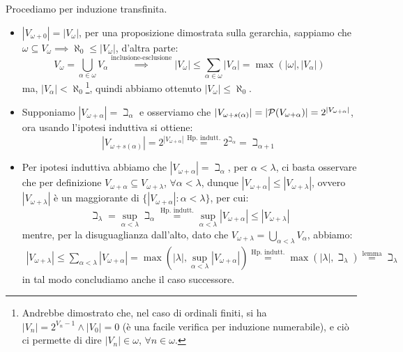 \begin{soln}
	Procediamo per induzione transfinita.
	\begin{itemize}
		\item[$\boxed{\text{caso 0}}$] $|V_{\omega + 0}| = |V_{\omega}|$, per una proposizione dimostrata sulla gerarchia, sappiamo che $\omega \subseteq V_{\omega} \implies \aleph_0 \leq |V_{\omega}|$, d'altra parte:
		\[ V_{\omega} = \bigcup_{\alpha \in \omega} V_{\alpha} \overset{\text{inclusione-esclusione}}{\implies} |V_\omega| \leq \sum_{\alpha \in \omega} |V_{\alpha}| = \max(|\omega|,|V_\alpha|)
			\]
		ma, $|V_\alpha| < \aleph_0$\footnote{Andrebbe dimostrato che, nel caso di ordinali finiti, si ha $|V_n| = 2^{V_n-1} \land |V_0| = 0$ (\`e una facile verifica per induzione numerabile), e ci\`o ci permette di dire $|V_n| \in \omega$, $\forall n \in \omega$.}, quindi abbiamo ottenuto $|V_\omega| \leq \aleph_0$. 
		\item[$\boxed{\text{caso $s(\alpha)$}}$] Supponiamo $|V_{\omega + \alpha}| = \beth_{\alpha}$ e osserviamo che $|V_{\omega + s(\alpha)}| = |\mathcal{P}(V_{\omega + \alpha})| = 2^{|V_{\omega + \alpha}|}$, ora usando l'ipotesi induttiva si ottiene:
		\[ |V_{\omega + s(\alpha)}| = 2^{|V_{\omega + \alpha}|} \overset{\text{Hp. indutt.}}{=} 2^{\beth_\alpha} = \beth_{\alpha + 1}
			\]
		\item[$\boxed{\text{caso limite}}$] Per ipotesi induttiva abbiamo che $|V_{\omega + \alpha}| = \beth_\alpha$, per $\alpha < \lambda$, ci basta osservare che per definizione $V_{\omega + \alpha} \subseteq V_{\omega + \lambda}$, $\forall \alpha < \lambda$, dunque $|V_{\omega + \alpha}| \leq |V_{\omega + \lambda}|$,
		ovvero $|V_{\omega + \lambda}|$ \`e un maggiorante di $\{|V_{\omega + \alpha}| : \alpha < \lambda\}$, per cui:
		\[ \beth_\lambda = \sup_{\alpha < \lambda} \beth_{\alpha} \overset{\text{Hp. indutt.}}{=} \sup_{\alpha < \lambda} |V_{\omega + \alpha}| \leq |V_{\omega + \lambda}|
			\]
		mentre, per la disuguaglianza dall'alto, dato che $V_{\omega + \lambda} = \bigcup_{\alpha < \lambda} V_{\alpha}$, abbiamo:
		\begin{align*}
			|V_{\omega + \lambda}| \leq \sum_{\alpha < \lambda} |V_{\omega + \alpha}|
								   = \max\left(|\lambda|,\sup_{\alpha < \lambda} |V_{\omega + \alpha}|\right)
								   \overset{\text{Hp. indutt.}}{=} \max(|\lambda|,\beth_\lambda)
								   \overset{\text{lemma}}{=} \beth_\lambda
		\end{align*}
		in tal modo concludiamo anche il caso successore.
	\end{itemize}
\end{soln}

